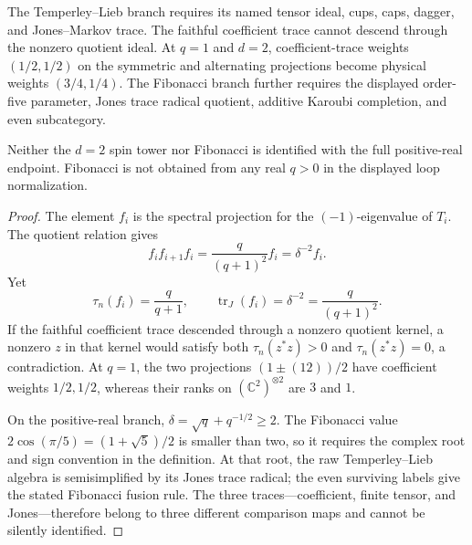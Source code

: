 \begin{theorem}
{\normalfont\statusProved}\quad The Temperley--Lieb branch requires its
named tensor ideal, cups, caps, dagger, and Jones--Markov trace.  The faithful
coefficient trace cannot descend through the nonzero quotient ideal.  At
$q=1$ and $d=2$, coefficient-trace weights $(1/2,1/2)$ on the symmetric and
alternating projections become physical weights $(3/4,1/4)$.  The Fibonacci
branch further requires the displayed order-five parameter, Jones trace
radical quotient, additive Karoubi completion, and even subcategory.
\end{theorem}
\begin{scope}
Neither the $d=2$ spin tower nor Fibonacci is identified with the full
positive-real endpoint.  Fibonacci is not obtained from any real $q>0$ in
the displayed loop normalization.
\end{scope}
\begin{proof}
The element $f_i$ is the spectral projection for the $(-1)$-eigenvalue of
$T_i$.  The quotient relation gives
\[
 f_if_{i+1}f_i=\frac{q}{(q+1)^2}f_i=\delta^{-2}f_i.
\]
Yet
\[
 \tau_n(f_i)=\frac{q}{q+1},
 \qquad \operatorname{tr}_J(f_i)=\delta^{-2}
   =\frac{q}{(q+1)^2}.
\]
If the faithful coefficient trace descended through a nonzero quotient
kernel, a nonzero $z$ in that kernel would satisfy both
$\tau_n(z^*z)>0$ and $\tau_n(z^*z)=0$, a contradiction.  At $q=1$, the
two projections $(1\pm(12))/2$ have coefficient weights $1/2,1/2$, whereas
their ranks on $(\mathbb C^2)^{\otimes2}$ are $3$ and $1$.

On the positive-real branch,
$\delta=\sqrt q+q^{-1/2}\geq2$.  The Fibonacci value
$2\cos(\pi/5)=(1+\sqrt5)/2$ is smaller than two, so it requires the complex
root and sign convention in the definition.  At that root, the raw
Temperley--Lieb algebra is semisimplified by its Jones trace radical; the
even surviving labels give the stated Fibonacci fusion rule.  The three
traces---coefficient, finite tensor, and Jones---therefore belong to three
different comparison maps and cannot be silently identified.
\end{proof}
